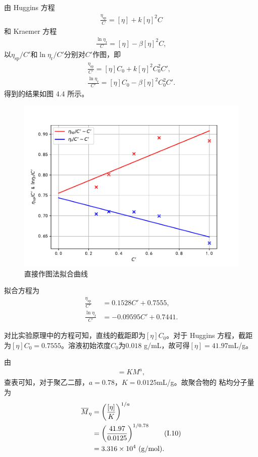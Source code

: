 \documentclass[12pt]{ctexart}
\numberwithin{equation}{section}
\begin{document}
由 Huggins 方程
\begin{align}
    \frac{\eta_\text{sp}}{C} = [\eta] + k[\eta]^2 C
    \tag{I.3}
\end{align}
和 Kraemer 方程
\begin{align}
    \frac{\ln\eta_\text{r}}{C} = [\eta] - \beta[\eta]^2 C,
    \tag{I.4}
\end{align}
以$\eta_\text{sp}/C'$和$\ln\eta_\text{r}/C'$分别对$C'$作图，即
\begin{align}
    \frac{\eta_\text{sp}}{C'}
        = [\eta]C_0 + k[\eta]^2 C_0^2 C',
    \tag{I.5} \\
    \frac{\ln\eta_\text{r}}{C'}
        = [\eta]C_0 - \beta[\eta]^2 C_0^2 C'.
    \tag{I.6}
\end{align}
得到的结果如图 4.4 所示。

\begin{figure}[!h]
    \centering
    \includegraphics[scale=0.8]{fitting1.pdf}
    \caption{直接作图法拟合曲线}
\end{figure}

拟合方程为
\begin{align}
    \frac{\eta_\text{sp}}{C'} &= 0.1528 C' + 0.7555,
    \tag{I.7} \\
    \frac{\ln\eta_\text{r}}{C'} &= -0.09595 C' + 0.7441.
    \tag{I.8}
\end{align}

对比实验原理中的方程可知，直线的截距即为$[\eta]C_0$。对于 Huggins
方程，截距为$[\eta]C_0 = 0.7555$。溶液初始浓度$C_0$为$0.018$
g/mL，故可得$[\eta] = 41.97$mL/g。

由
\begin{align}
    [\eta] = KM^a, \tag{I.9}
\end{align}
查表可知，对于聚乙二醇，$a = 0.78$，$K = 0.0125$mL/g。故聚合物的
粘均分子量为
\begin{align}
    \overline{M}_\eta
    &= \left(\frac{[\eta]}{K}\right)^{1/a} \notag\\
    &= \left(\frac{41.97}{0.0125}\right)^{1/0.78}
        \tag{I.10}\\
    &= 3.316\times 10^{4}~\mathrm{(g/mol)}. \notag
\end{align}
\end{document}
